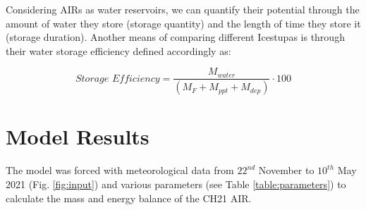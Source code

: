 \documentclass[utf8]{frontiersSCNS} %
\begin{document}
Considering AIRs as water reservoirs, we can quantify their potential through the amount of water they store (storage
quantity) and the length of time they store it (storage duration). Another means of comparing different Icestupas is
through their water storage efficiency defined accordingly as:

\begin{equation} \textit{Storage Efficiency} = \frac{M_{water}}{(M_F+M_{ppt}+M_{dep})} \cdot 100 \end{equation}


\section{Model Results} 

The model was forced with meteorological data from $22^{nd}$ November to $10^{th}$ May 2021 (Fig.
\ref{fig:input}) and various parameters (see Table \ref{table:parameters}) to calculate the mass and energy balance of
the CH21 AIR.
\end{document}

